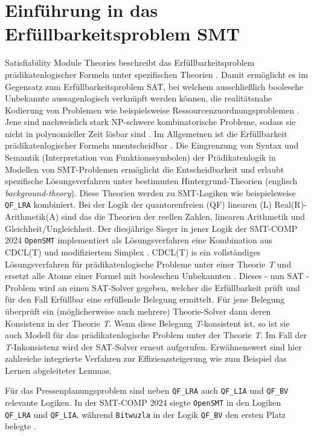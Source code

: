 \section{Einführung in das Erfüllbarkeitsproblem SMT}
\label{sec:smtbasics}
Satisfiability Module Theories beschreibt das Erfüllbarkeitsproblem prädikatenlogischer Formeln unter spezifischen Theorien \cite{smt}.
Damit ermöglicht es im Gegensatz zum Erfüllbarkeitsproblem SAT, bei welchem ausschließlich boolesche Unbekannte aussagenlogisch verknüpft werden können,
die realitätsnahe Kodierung von Problemen wie beispielsweise Ressourcenzuordnungsproblemen \cite{rcpsp}.
Jene sind nachweislich stark NP-schwere kombinatorische Probleme, sodass sie nicht in polynomieller Zeit lösbar sind \cite{rcpspnp}.
Im Allgemeinen ist die Erfüllbarkeit prädikatenlogischer Formeln unentscheidbar \cite{smt}.
Die Eingrenzung von Syntax und Semantik (Interpretation von Funktionssymbolen) der Prädikatenlogik in Modellen von SMT-Problemen
ermöglicht die Entscheidbarkeit und erlaubt spezifische Lösungsverfahren unter bestimmten Hintergrund-Theorien (englisch \textit{background-theory}).
Diese Theorien werden zu SMT-Logiken wie beispielsweise \texttt{QF\_LRA} kombiniert.
Bei der Logik der quantorenfreien (QF) linearen (L) Real(R)-Arithmetik(A) sind das die Theorien der reellen Zahlen, linearen Arithmetik und Gleichheit/Ungleichheit.
Der diesjährige Sieger in jener Logik der SMT-COMP 2024 \texttt{OpenSMT} \cite{smtcomp2024results} implementiert als Lösungsverfahren eine Kombination aus CDCL(T) und modifiziertem Simplex \cite{opensmt}.
CDCL(T) is ein vollständiges Lösungsverfahren für prädikatenlogische Probleme unter einer Theorie \textit{T} und ersetzt alle Atome einer Formel mit booleschen Unbekannten \cite{smt}.
Dieses - nun SAT - Problem wird an einen SAT-Solver gegeben, welcher die Erfüllbarkeit prüft und für den Fall Erfüllbar eine erfüllende Belegung ermittelt.
Für jene Belegung überprüft ein (möglicherweise auch mehrere) Theorie-Solver dann deren Konsistenz in der Theorie \textit{T}.
Wenn diese Belegung \textit{T}-konsistent ist, so ist sie auch Modell für das prädikatenlogische Problem unter der Theorie \textit{T}.
Im Fall der \textit{T}-Inkonsistenz wird der SAT-Solver erneut aufgerufen.
Erwähnenswert sind hier zahlreiche integrierte Verfahren zur Effizienzsteigerung wie zum Beispiel das Lernen abgeleiteter Lemmas.

Für das Pressenplanungsproblem sind neben \texttt{QF\_LRA} auch \texttt{QF\_LIA} und \texttt{QF\_BV} relevante Logiken.
In der SMT-COMP 2024 siegte \texttt{OpenSMT} in den Logiken \texttt{QF\_LRA} und \texttt{QF\_LIA}, während \texttt{Bitwuzla} in der Logik \texttt{QF\_BV} den ersten Platz belegte \cite{smtcomp2024results}.

